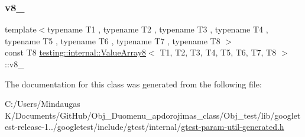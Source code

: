 \subsubsection{\texorpdfstring{v8\_}{v8\_}}
{\footnotesize\ttfamily template$<$typename T1 , typename T2 , typename T3 , typename T4 , typename T5 , typename T6 , typename T7 , typename T8 $>$ \\
const T8 \mbox{\hyperlink{classtesting_1_1internal_1_1_value_array8}{testing\+::internal\+::\+Value\+Array8}}$<$ T1, T2, T3, T4, T5, T6, T7, T8 $>$\+::v8\+\_\+\hspace{0.3cm}{\ttfamily [private]}}



The documentation for this class was generated from the following file\+:\begin{DoxyCompactItemize}
\item 
C\+:/\+Users/\+Mindaugas K/\+Documents/\+Git\+Hub/\+Obj\+\_\+\+Duomenu\+\_\+apdorojimas\+\_\+class/\+Obj\+\_\+test/lib/googletest-\/release-\/1../googletest/include/gtest/internal/\mbox{\hyperlink{gtest-param-util-generated_8h}{gtest-\/param-\/util-\/generated.\+h}}\end{DoxyCompactItemize}
